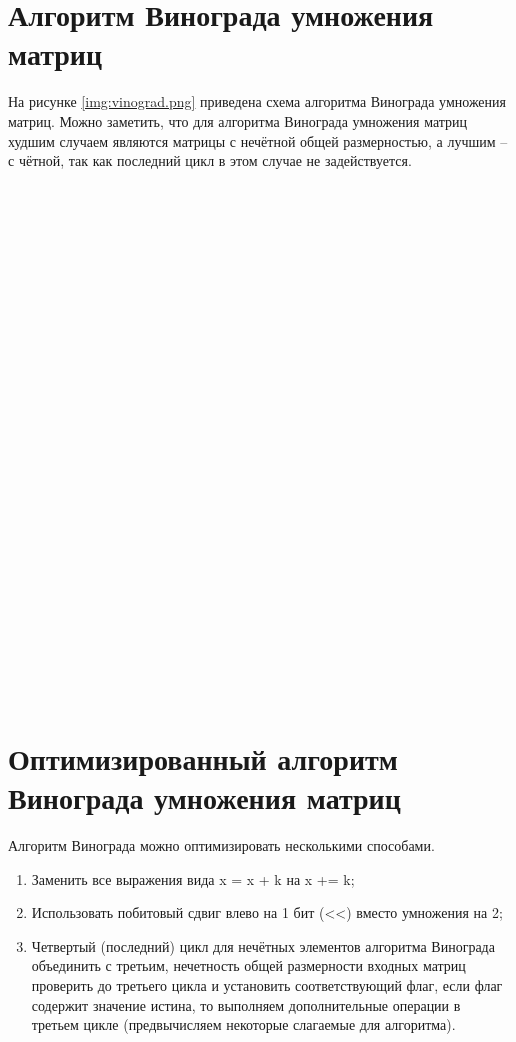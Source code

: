 \section{Алгоритм Винограда умножения матриц}
На рисунке \ref{img:vinograd.png} приведена схема алгоритма Винограда умножения матриц.
Можно заметить, что для алгоритма Винограда умножения матриц худшим случаем являются матрицы с нечётной общей размерностью, а лучшим -- с чётной, так как последний цикл в этом случае не задействуется.
\\
\\
\\
\\
\\
\\
\\
\\
\\
\\
\\
\\
\\
\\
\\
\\
\\
\\
\\
\\
\\
\\
\\
\\
\\
\\
\\
\\



\FloatBarrier
\section{Оптимизированный алгоритм Винограда умножения матриц}
Алгоритм Винограда можно оптимизировать несколькими способами.
\begin{enumerate}[label={\arabic*)}]
	\item Заменить все выражения вида x = x + k на x += k;
	\item Использовать побитовый сдвиг влево на 1 бит (<<) вместо умножения на 2;
	\item Четвертый (последний) цикл для нечётных элементов алгоритма Винограда объединить с третьим, нечетность общей размерности входных матриц проверить до третьего цикла и установить соответствующий флаг, если флаг содержит значение истина, то выполняем дополнительные операции в третьем цикле (предвычисляем некоторые слагаемые для алгоритма).
\end{enumerate}


